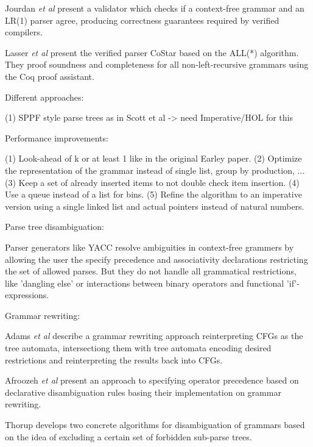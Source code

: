 \begin{isabellebody}
\begin{isamarkuptext}
Jourdan \textit{et al} \cite{Jourdan:2012} present a validator which checks if a context-free grammar
and an LR(1) parser agree, producing correctness guarantees required by verified compilers.

Lasser \textit{et al} \cite{Lasser:2021} present the verified parser CoStar based on the ALL(*) algorithm.
They proof soundness and completeness for all non-left-recursive grammars using the Coq proof assistant.%
\end{isamarkuptext}\isamarkuptrue%
%
\isadelimdocument
%
\endisadelimdocument
%
\isatagdocument
%
\isamarkuptrue%
%
\endisatagdocument
{\isafolddocument}%
%
\isadelimdocument
%
\endisadelimdocument
%
\begin{isamarkuptext}%
Different approaches:

(1) SPPF style parse trees as in Scott et al -> need Imperative/HOL for this

Performance improvements:

(1) Look-ahead of k or at least 1 like in the original Earley paper.
(2) Optimize the representation of the grammar instead of single list, group by production, ...
(3) Keep a set of already inserted items to not double check item insertion.
(4) Use a queue instead of a list for bins.
(5) Refine the algorithm to an imperative version using a single linked list and actual pointers instead
    of natural numbers.%
\end{isamarkuptext}\isamarkuptrue%
%
\begin{isamarkuptext}%
Parse tree disambiguation:

Parser generators like YACC resolve ambiguities in context-free grammers by allowing the user
the specify precedence and associativity declarations restricting the set of allowed parses. But they
do not handle all grammatical restrictions, like 'dangling else' or interactions between binary operators
and functional 'if'-expressions.

Grammar rewriting:

Adams \textit{et al} \cite{Adams:2017} describe a grammar rewriting approach reinterpreting CFGs as
the tree automata, intersectiong them with tree automata encoding desired restrictions and reinterpreting
the results back into CFGs.

Afroozeh \textit{et al} \cite{Afroozeh:2013} present an approach to specifying operator precedence
based on declarative disambiguation rules basing their implementation on grammar rewriting.

Thorup \cite{Thorup:1996} develops two concrete algorithms for disambiguation of grammars based on the idea of 
excluding a certain set of forbidden sub-parse trees.


\end{isamarkuptext}
\end{isabellebody}
